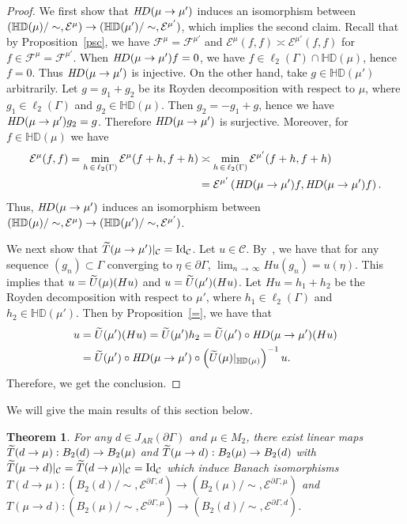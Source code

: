 \documentclass[10pt]{amsart}
\newtheorem{theo}{Theorem}[section]
\theoremstyle{definition}\newtheorem{defi}[theo]{Definition}\newtheorem{rema}[theo]{Remark}\newtheorem{exam}[theo]{Example}\newtheorem{exem}[theo]{Example}\newtheorem{nota}[theo]{Notation}
\newcommand{\ce}{\mathcal{E}}
\newcommand{\cf}{\mathcal{F}}
\newcommand{\cC}{\mathcal{C}}
\newcommand{\bHD}{\mathbb{HD}}
\newcommand{\rmId}{\mathrm{Id}}
\let\oldtilde\tilde
\renewcommand*{\tilde}[1]{\mathchoice{\widetilde{#1}}{\widetilde{#1}}{\oldtilde{#1}}{\oldtilde{#1}}}
\begin{document}
\begin{proof}
We first show that ${\textit HD}(\mu\rightarrow\mu')$ induces an isomorphism between $(\bHD(\mu)\linebreak/\sim,\ce^{\mu})\rightarrow(\bHD(\mu')/\sim,\ce^{\mu'})$, which implies the second claim. Recall that by Proposition~\ref{psc}, we have $\cf^{\mu}=\cf^{\mu'}$ and $\ce^{\mu}(f,f)\asymp\ce^{\mu'}(f,f)$ for $f\in\cf^{\mu}=\cf^{\mu'}$. When ${\textit HD}(\mu\rightarrow\mu')f=0$, we have $f\in\ell_2(\Gamma)\cap\bHD(\mu)$, hence $f=0$. Thus ${\textit HD}(\mu\rightarrow\mu')$ is injective. On the other hand, take $g\in\bHD(\mu')$ arbitrarily. Let $g=g_1+g_2$ be its Royden decomposition with respect to $\mu$, where $g_1\in\ell_2(\Gamma)$ and $g_2\in\bHD(\mu)$. Then $g_2=-g_1+g$, hence we have ${\textit HD}(\mu\rightarrow\mu')g_2=g$. Therefore ${\textit HD}(\mu\rightarrow\mu')$ is surjective. Moreover, for $f\in\bHD(\mu)$ we have
\begin{align*}
\ce^{\mu}(f,f)=\min_{h\,\in\,\ell_2(\Gamma)}\ce^{\mu}(f+h,f+h)&\asymp
\min_{h\,\in\,\ell_2(\Gamma)}\ce^{\mu'}(f+h,f+h)\\
&=\ce^{\mu'}\left({\textit HD}(\mu\rightarrow\mu')f,{\textit HD}(\mu\rightarrow\mu')f\right).
\end{align*}
Thus, ${\textit HD}(\mu\rightarrow\mu')$ induces an isomorphism between $(\bHD(\mu)/\sim,\ce^{\mu})\rightarrow(\bHD(\mu')/\linebreak \sim,\ce^{\mu'})$.

We next show that $\tilde{T}(\mu\to\mu')|_\cC=\rmId_\cC$. Let $u\in\cC$. By~\cite[Lemma~2.2]{Ka}, we have that for any sequence $(g_n)\subset\Gamma$ converging to $\eta\in\partial\Gamma$, $\lim_{n\,\to\,\infty}Hu(g_n)=u(\eta)$. This implies that $u=\tilde{U}(\mu)(Hu)$ and $u=\tilde{U}(\mu')(Hu)$. Let $Hu=h_1+h_2$ be the Royden decomposition with respect to $\mu'$, where $h_1\in\ell_2(\Gamma)$ and $h_2\in\bHD(\mu')$. Then by Proposition~\ref{=}, we have that
\begin{align*}
u&=\tilde{U}(\mu')(Hu)=\tilde{U}(\mu')h_2 =\tilde{U}(\mu')\circ {\textit HD}(\mu\rightarrow\mu')(Hu)\\
&=\tilde{U}(\mu')\circ {\textit HD}(\mu\rightarrow\mu')\circ \left(\tilde{U}(\mu)|_{\bHD(\mu)}\right)^{-1}u.
\end{align*}
Therefore, we get the conclusion.
\end{proof}


We will give the main results of this section below.


\begin{theo}\label{iso}
For any $d\in J_{AR}(\partial \Gamma)$ and $\mu\in M_2$, there exist linear maps $\tilde{T}(d\rightarrow\mu): B_2(d)\rightarrow B_2(\mu)$ and $\tilde{T}(\mu\rightarrow d):B_2(\mu)\rightarrow B_2(d)$ with $\tilde{T}(\mu\to d)|_\cC=\tilde{T}(d\to\mu)|_\cC=\rmId_\cC$ which induce Banach isomorphisms $T(d\rightarrow\mu): (B_2(d)/\sim,\ce^{\partial\Gamma,d})\rightarrow(B_2(\mu)/\sim,\ce^{\partial\Gamma,\mu})$ and $T(\mu\rightarrow d):(B_2(\mu)/\sim,\ce^{\partial\Gamma,\mu})\rightarrow (B_2(d)/\sim,\ce^{\partial\Gamma,d})$.
\end{theo}
\end{document}
